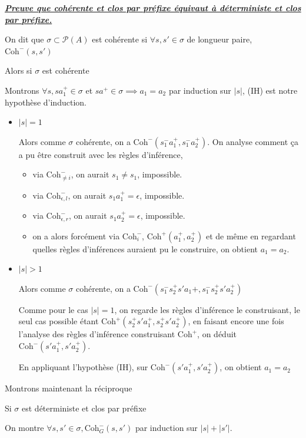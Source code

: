 \documentclass[a4paper,12pt]{article}
\renewenvironment{leftbar}{
  \def\FrameCommand{\vrule width 1pt \hspace{10pt}}
  \MakeFramed {\advance\hsize-\width \FrameRestore}
\setlength{\parskip}{10pt}}
 {\endMakeFramed}
\newenvironment{answernopage}[1]
{
  \vspace{0.5cm} \noindent
  \textbf{\textit{\uline{#1}}}
  \begin{leftbar}
}
{
    \end{leftbar}\vspace{0.2cm}
}
\begin{document}
\begin{answernopage}{Preuve que cohérente et clos par préfixe équivaut à déterministe et clos par préfixe.}
On dit que $\sigma \subset \mathcal{P}(A)$ est cohérente si
$\forall s, s' \in \sigma$ de longueur paire, $ \text{Coh}^-(s,s')$

Alors si $\sigma$ est cohérente

Montrons $\forall s, sa_1^+ \in \sigma$ et $s a^+ \in \sigma \implies a_1 = a_2$
par induction sur $|s|$, (IH) est notre hypothèse d'induction.

\begin{itemize}
\item $|s| = 1$

Alors comme $\sigma$ cohérente, on a $\text{Coh}^-(s_1^-a_1^+,s_1^-a_2^+)$.
On analyse comment ça a pu être construit avec les règles d'inférence,
\begin{itemize}
\item via $\text{Coh}^-_{\neq i}$, on aurait $s_1 \neq s_1$, impossible.
\item via $\text{Coh}^-_{\epsilon,l}$, on aurait $s_1a_1^+ = \epsilon$, impossible.
\item via $\text{Coh}^-_{\epsilon,r}$, on aurait $s_1a_2^+ = \epsilon$, impossible.
\item on a alors forcément via $\text{Coh}^-_i$, $\text{Coh}^+(a_1^+,a_2^+)$
et de même en regardant quelles règles d'inférences auraient pu le construire,
on obtient $a_1 = a_2$.

\end{itemize}
\item $|s| > 1$

Alors comme $\sigma$ cohérente, on a $\text{Coh}^-(s_1^-s_2^+s'a_1+,s_1^-s_2^+s'a_2^+)$

Comme pour le cas $|s|=1$, on regarde les règles d'inférence le construisant,
le seul cas possible étant $\text{Coh}^+(s_2^+s'a_1^+, s_2^+s'a_2^+)$,
en faisant encore une fois l'analyse
des règles d'inférence construisant $\text{Coh}^+$,
on déduit $\text{Coh}^-(s'a_1^+, s'a_2^+)$.

En appliquant l'hypothèse (IH), sur $\text{Coh}^-(s'a_1^+,s'a_2^+)$, on
obtient $a_1 = a_2$

\end{itemize}

Montrons maintenant la réciproque

Si $\sigma$ est déterministe et clos par préfixe

On montre $\forall s, s' \in \sigma, \text{Coh}^-_G(s,s')$ par induction sur
$|s|+|s'|$.


\end{answernopage}
\end{document}
